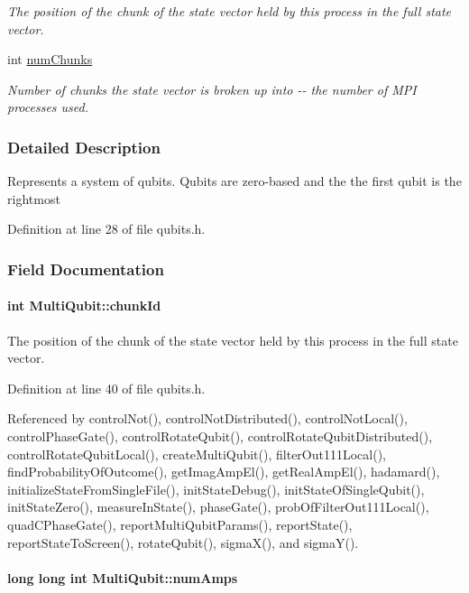\begin{DoxyCompactItemize}
\begin{DoxyCompactList}\small\item\em The position of the chunk of the state vector held by this process in the full state vector. \item\end{DoxyCompactList}\item 
int \hyperlink{structMultiQubit_acd43f2f57991709c9e94f73662c972b2}{numChunks}
\begin{DoxyCompactList}\small\item\em Number of chunks the state vector is broken up into -\/-\/ the number of MPI processes used. \item\end{DoxyCompactList}\end{DoxyCompactItemize}


\subsubsection{Detailed Description}
Represents a system of qubits. Qubits are zero-\/based and the the first qubit is the rightmost 

Definition at line 28 of file qubits.h.

\subsubsection{Field Documentation}
\hypertarget{structMultiQubit_ab10c88249fa3825d6227ceec01d37e37}{
\paragraph[{chunkId}]{\setlength{\rightskip}{0pt plus 5cm}int {\bf MultiQubit::chunkId}}\hfill}
\label{structMultiQubit_ab10c88249fa3825d6227ceec01d37e37}


The position of the chunk of the state vector held by this process in the full state vector. 

Definition at line 40 of file qubits.h.

Referenced by controlNot(), controlNotDistributed(), controlNotLocal(), controlPhaseGate(), controlRotateQubit(), controlRotateQubitDistributed(), controlRotateQubitLocal(), createMultiQubit(), filterOut111Local(), findProbabilityOfOutcome(), getImagAmpEl(), getRealAmpEl(), hadamard(), initializeStateFromSingleFile(), initStateDebug(), initStateOfSingleQubit(), initStateZero(), measureInState(), phaseGate(), probOfFilterOut111Local(), quadCPhaseGate(), reportMultiQubitParams(), reportState(), reportStateToScreen(), rotateQubit(), sigmaX(), and sigmaY().\hypertarget{structMultiQubit_ae16f47d8b725c914fb7f66b6498d79db}{
\paragraph[{numAmps}]{\setlength{\rightskip}{0pt plus 5cm}long long int {\bf MultiQubit::numAmps}}\hfill}
\label{structMultiQubit_ae16f47d8b725c914fb7f66b6498d79db}


